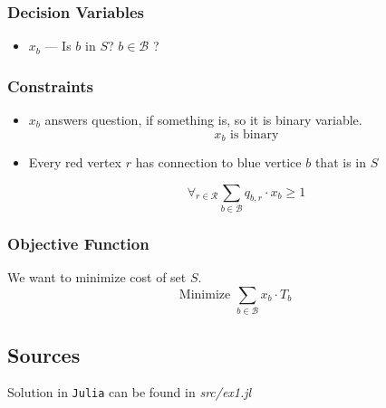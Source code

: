 \subsubsection*{Decision Variables}
\begin{itemize}
    \item $x_b$ --- Is $b$ in $S$? $b \in \mathcal{B}$ ? 
\end{itemize}
\subsubsection*{Constraints}
\begin{itemize}
    \item $x_b$ answers question, if something is, so it is binary variable.
    $$x_b\textrm{ is binary} $$
    \item Every red vertex $r$ has connection to blue vertice $b$ that is in $S$
    
    $$\forall_{r \in \mathcal{R}} \mathrm{ } \sum_{b \in \mathcal{B} } q_{b, r} \cdot x_b \geqslant 1 $$
\end{itemize}
\subsubsection*{Objective Function}
We want to minimize cost of set $S$.
$$
\textrm{Minimize } \sum_{b \in \mathcal{B}}  x_b \cdot T_b
$$
\subsection{Sources}
Solution in \texttt{Julia} can be found in  \textit{src/ex1.jl}

